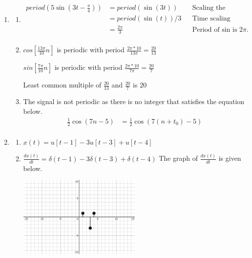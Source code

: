 \documentclass[10pt,a4paper, margin=1in]{article}
\begin{document}
\begin{enumerate}
\begin{enumerate}
    
    \end{enumerate}

\item %
    \begin{enumerate}
    \item \begin{align*}
        period(5\sin(3t - \frac{\pi}{4})) & = period(\sin(3t)) && \text{Scaling the amplitude does not affect the period, neither does shifting.} \\
        & = period(\sin(t)) / 3 && \text{Time scaling inversely affects the period.} \\
        & = \frac{2\pi}{3} && \text{Period of sin is } 2\pi. \\
    \end{align*}    
    \item $cos[\frac{13\pi}{10}n]$ is periodic with period $\frac{2\pi*10}{13\pi} = \frac{20}{13}$
    
    $sin[\frac{7\pi}{10}n]$ is periodic with period $\frac{2\pi*10}{7\pi} = \frac{20}{7}$

    Least common multiple of $\frac{20}{13}$ and $\frac{20}{7}$ is $20$

	\item The signal is not periodic as there is no integer that satisfies the equation below.
    \begin{align*}
        \frac{1}{2}\cos(7n - 5) & = \frac{1}{2}\cos(7(n + t_0) - 5) \\
    \end{align*}
    \end{enumerate}

\item %
    \begin{enumerate}
    \item $x(t) = u[t-1] - 3u[t-3] + u[t-4]$
    \item $\frac{dx(t)}{dt} = \delta(t-1) -3\delta(t-3) +\delta(t-4)$
        The graph of $\frac{dx(t)}{dt}$ is given below.
        \begin{center}
            \includegraphics*[width=0.5\textwidth]{assets/graphs/q5b.png}
        \end{center}
    \end{enumerate}    
    

\end{enumerate}
\end{document}
